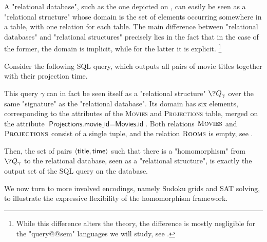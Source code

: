 \begin{example}
	\AP\label{ex:sql-as-hom}
	A "relational database", such as the one depicted on
	, can easily be seen as a "relational structure"
	whose domain is the set of elements occurring somewhere in a table,
	with one relation for each table.
	The main difference between "relational databases" and "relational structures"
	precisely lies in the fact that in the case of the former, the domain is implicit,
	while for the latter it is explicit.%
	\footnote{While this difference alters the theory, the difference is mostly negligible
	for the "query@@sem" languages we will study, see .}

	Consider the following SQL query, which outputs all pairs
	of movie titles together with their projection time.
	

	This query $\gamma$ can in fact be seen itself as a "relational structure" $\?Q_\gamma$	over
	the same "signature" as the "relational database".
	Its domain has six elements, corresponding to the attributes of
	the \textsc{Movies} and \textsc{Projections} table, merged on the attribute
	$\textsf{Projections.movie\_id} = \textsf{Movies.id}$.
	Both relations $\textsc{Movies}$ and $\textsc{Projections}$ consist of a single tuple,
	and the relation $\textsc{Rooms}$ is empty, see .

	Then, the set of pairs $\langle\textsf{title}, \textsf{time}\rangle$
	such that there is a "homomorphism" from $\?Q_\gamma$ to the relational database, seen as
	a "relational structure", is exactly the output set of the SQL query on the database.
\end{example}

We now turn to more involved encodings, namely Sudoku grids and SAT solving,
to illustrate the expressive flexibility of the homomorphism framework.

